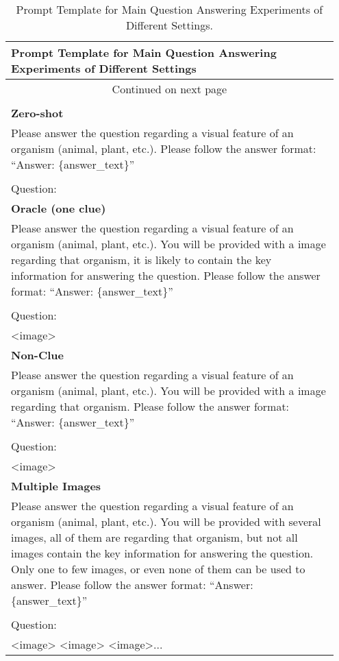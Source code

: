 \begin{longtable}{p{0.95\linewidth}}
\end{longtable}


\begin{longtable}{p{0.95\linewidth}}
\label{tab:prompt_qa}\\

\toprule[2pt]
\textbf{Prompt Template for Main Question Answering Experiments of Different Settings}\\ \midrule[1.2pt]
\endfirsthead

\midrule
\endhead

\hline \multicolumn{1}{c}{{Continued on next page}} \\ \hline
\endfoot

\bottomrule[1.2pt]\\[-0.8em]
\caption{Prompt Template for Main Question Answering Experiments of Different Settings.}
\endlastfoot


\textbf{Zero-shot}\\
\midrule
Please answer the question regarding a visual feature of an organism (animal, plant, etc.). Please follow the answer format: ``Answer: \{answer\_text\}''\\\\Question: \\
\midrule[1.2pt]

\textbf{Oracle (one clue)}\\
Please answer the question regarding a visual feature of an organism (animal, plant, etc.). You will be provided with a image regarding that organism, it is likely to contain the key information for answering the question. Please follow the answer format: ``Answer: \{answer\_text\}''\\\\Question:\\<image>\\
\midrule[1.2pt]

\textbf{Non-Clue}\\
Please answer the question regarding a visual feature of an organism (animal, plant, etc.). You will be provided with a image regarding that organism. Please follow the answer format: ``Answer: \{answer\_text\}''\\\\Question:\\<image>\\
\midrule[1.2pt]

\textbf{Multiple Images}\\
Please answer the question regarding a visual feature of an organism (animal, plant, etc.). You will be provided with several images, all of them are regarding that organism, but not all images contain the key information for answering the question. Only one to few images, or even none of them can be used to answer. Please follow the answer format: ``Answer: \{answer\_text\}''\\\\Question:\\<image> <image> <image>...\\


\end{longtable}


